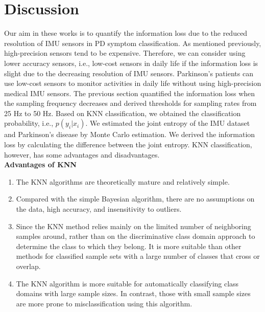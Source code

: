 \chapter{Discussion}
Our aim in these works is to quantify the information loss due to the reduced resolution of IMU sensors in PD symptom classification. As mentioned previously, high-precision sensors tend to be expensive. Therefore, we can consider using lower accuracy sensors, i.e., low-cost sensors in daily life if the information loss is slight due to the decreasing resolution of IMU sensors. Parkinson's patients can use low-cost sensors to monitor activities in daily life without using high-precision medical IMU sensors.
The previous section quantified the information loss when the sampling frequency decreases and derived thresholds for sampling rates from 25 Hz to 50 Hz. Based on KNN classification, we obtained the classification probability, i.e., $p(y_{i} | x_{i})$. We estimated the joint entropy of the IMU dataset and Parkinson's disease by Monte Carlo estimation. We derived the information loss by calculating the difference between the joint entropy. KNN classification, however, has some advantages and disadvantages. \\

\textbf{Advantages of KNN}
\begin{enumerate}
    \item The KNN algorithms are theoretically mature and relatively simple.
    \item Compared with the simple Bayesian algorithm, there are no assumptions on the data, high accuracy, and insensitivity to outliers. \cite{8079967}
    \item  Since the KNN method relies mainly on the limited number of neighboring samples around, rather than on the discriminative class domain approach to determine the class to which they belong. It is more suitable than other methods for classified sample sets with a large number of classes that cross or overlap.
    \item The KNN algorithm is more suitable for automatically classifying class domains with large sample sizes. In contrast, those with small sample sizes are more prone to misclassification using this algorithm.
\end{enumerate}


